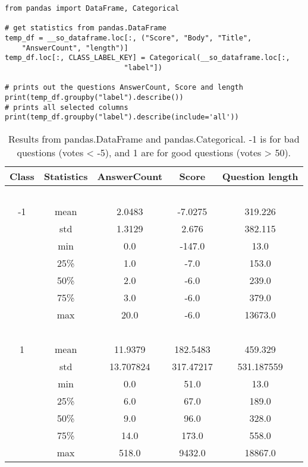 \newpage
\begin{lstlisting}[caption={Getting Categorical data from pandas.DataFrame}, 
label={lst:pandas_categorical}, basicstyle=\small] 
from pandas import DataFrame, Categorical

# get statistics from pandas.DataFrame
temp_df = __so_dataframe.loc[:, ("Score", "Body", "Title", 
	"AnswerCount", "length")]
temp_df.loc[:, CLASS_LABEL_KEY] = Categorical(__so_dataframe.loc[:, 
							"label"])

# prints out the questions AnswerCount, Score and length
print(temp_df.groupby("label").describe())
# prints all selected columns
print(temp_df.groupby("label").describe(include='all'))
\end{lstlisting}

\begin{table}[tbp]
	\centering
	\begin{tabular}{| c | c | c | c |c |}
		\hline
		Class 		& Statistics	& AnswerCount		& Score 		& Question length 	\\ \hline
		~ 			& ~ 			& ~  				& ~ 			& ~					\\ \hline
		-1 			& mean 		& 2.0483 			& -7.0275 		& 319.226 		\\ \hline
		~ 			& std 		& 1.3129 			& 2.676 		& 382.115  		\\ \hline
		~ 			& min 		& 0.0 				& -147.0 		& 13.0  		\\ \hline
		~ 			& 25\% 		& 1.0 				& -7.0 			& 153.0 		\\ \hline
		~ 			& 50\% 		& 2.0 				& -6.0 			& 239.0  		\\ \hline
		~ 			& 75\% 		& 3.0 				& -6.0 			& 379.0  		\\ \hline
		~ 			& max 		& 20.0 				& -6.0 			& 13673.0  		\\ \hline
		~ 			& ~ 		& ~  				& ~ 			& ~				\\ \hline
		1 			& mean 		& 11.9379 			& 182.5483 		& 459.329		\\ \hline
		~ 			& std 		& 13.707824			& 317.47217 	& 531.187559  		\\ \hline
		~ 			& min 		& 0.0 				& 51.0 			& 13.0  		\\ \hline
		~ 			& 25\% 		& 6.0 				& 67.0 			& 189.0 		\\ \hline
		~ 			& 50\% 		& 9.0 				& 96.0 			& 328.0  		\\ \hline
		~ 			& 75\% 		& 14.0 				& 173.0 		& 558.0  		\\ \hline
		~ 			& max 		& 518.0 			& 9432.0 		& 18867.0  		\\ \hline
		
	\end{tabular}
	\caption{Results from pandas.DataFrame and pandas.Categorical. -1 is for bad questions (votes < -5), 
		and 1 are for good questions (votes > 50).}
	\label{tab:pandas_categorical}
\end{table}

